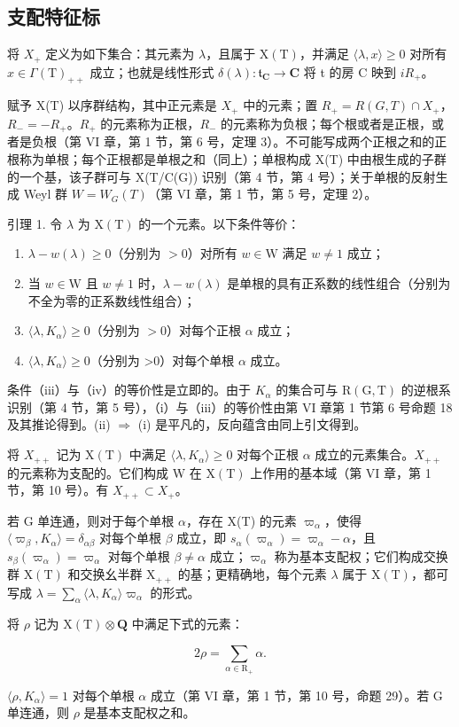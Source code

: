 \subsection{支配特征标}

将 \(X_{+}\) 定义为如下集合：其元素为 \(\lambda\)，且属于 \(\mathrm{X(T)}\)，并满足 \(\langle\lambda,x\rangle\geq0\) 对所有 \(x\in\Gamma(\mathrm{T})_{++}\) 成立；也就是线性形式 \(\delta(\lambda):\mathfrak{t}_{\mathbf{C}}\to\mathbf{C}\) 将 t 的房 C 映到 \(iR_{+}\)。

赋予 X(T) 以序群结构，其中正元素是 \(X_{+}\) 中的元素；置 \(R_{+} = R(G, T) \cap X_{+}\)，\(R_{-} = -R_{+}\)。\(R_{+}\) 的元素称为正根，\(R_{-}\) 的元素称为负根；每个根或者是正根，或者是负根（第 VI 章，第 1 节，第 6 号，定理 3）。不可能写成两个正根之和的正根称为单根；每个正根都是单根之和（同上）；单根构成 X(T) 中由根生成的子群的一个基，该子群可与 X(T/C(G)) 识别（第 4 节，第 4 号）；关于单根的反射生成 Weyl 群 \(W = W_{G}(T)\)（第 VI 章，第 1 节，第 5 号，定理 2）。

引理 1. 令 \(\lambda\) 为 \(\mathrm{X(T)}\) 的一个元素。以下条件等价：

\begin{enumerate}
\def\labelenumi{(\roman{enumi})}
\item
  \(\lambda - w(\lambda) \geq 0\)（分别为 \(>0\)）对所有 \(w \in \mathrm{W}\) 满足 \(w \neq 1\) 成立；
\item
  当 \(w \in \mathrm{W}\) 且 \(w \neq 1\) 时，\(\lambda - w(\lambda)\) 是单根的具有正系数的线性组合（分别为不全为零的正系数线性组合）；
\item
  \(\langle \lambda, K_{\alpha} \rangle \geq 0\)（分别为 \(>0\)）对每个正根 \(\alpha\) 成立；
\item
  \(\langle\lambda,K_{\alpha}\rangle\geq0\)（分别为 >0）对每个单根 \(\alpha\) 成立。
\end{enumerate}

条件（iii）与（iv）的等价性是立即的。由于 \(K_{\alpha}\) 的集合可与 \(\mathrm{R}(\mathrm{G},\mathrm{T})\) 的逆根系识别（第 4 节，第 5 号），（i）与（iii）的等价性由第 VI 章第 1 节第 6 号命题 18 及其推论得到。(ii) \(\Rightarrow\) (i) 是平凡的，反向蕴含由同上引文得到。

将 \(X_{++}\) 记为 \(\mathrm{X(T)}\) 中满足 \(\langle\lambda,K_{\alpha}\rangle\geq0\) 对每个正根 \(\alpha\) 成立的元素集合。\(X_{++}\) 的元素称为支配的。它们构成 W 在 \(\mathrm{X(T)}\) 上作用的基本域（第 VI 章，第 1 节，第 10 号）。有 \(X_{++}\subset X_{+}\)。

若 G 单连通，则对于每个单根 \(\alpha\)，存在 X(T) 的元素 \(\varpi_{\alpha}\)，使得 \(\langle\varpi_{\beta}, K_{\alpha}\rangle = \delta_{\alpha\beta}\) 对每个单根 \(\beta\) 成立，即 \(s_{\alpha}(\varpi_{\alpha}) = \varpi_{\alpha} - \alpha\)，且 \(s_{\beta}(\varpi_{\alpha}) = \varpi_{\alpha}\) 对每个单根 \(\beta \neq \alpha\) 成立；\(\varpi_{\alpha}\) 称为基本支配权；它们构成交换群 \(\mathrm{X(T)}\) 和交换幺半群 \(\mathrm{X}_{++}\) 的基；更精确地，每个元素 \(\lambda\) 属于 \(\mathrm{X(T)}\)，都可写成 \(\lambda = \sum_{\alpha} \langle \lambda, K_{\alpha} \rangle \varpi_{\alpha}\) 的形式。

将 \(\rho\) 记为 \(\mathrm{X(T)}\otimes \mathbf{Q}\) 中满足下式的元素：

\[
2 \rho = \sum_ {\alpha \in \mathrm{R} _ {+}} \alpha .
\]

\(\langle\rho,K_{\alpha}\rangle=1\) 对每个单根 \(\alpha\) 成立（第 VI 章，第 1 节，第 10 号，命题 29）。若 G 单连通，则 \(\rho\) 是基本支配权之和。

